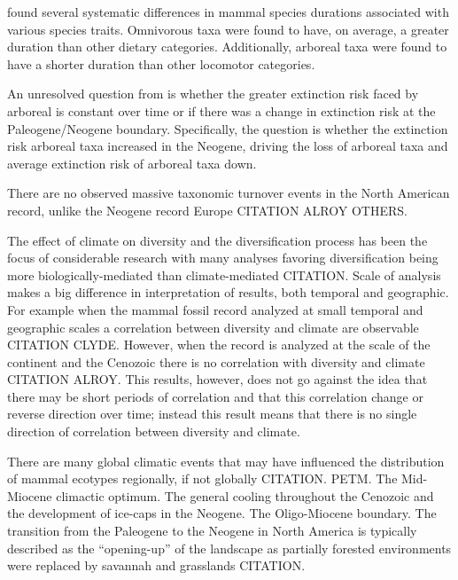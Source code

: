 \documentclass[12pt,letterpaper]{article}
\begin{document}
\citet{Smits2015} found several systematic differences in mammal species durations associated with various species traits. Omnivorous taxa were found to have, on average, a greater duration than other dietary categories. Additionally, arboreal taxa were found to have a shorter duration than other locomotor categories. 

An unresolved question from \citet{Smits2015} is whether the greater extinction risk faced by arboreal is constant over time or if there was a change in extinction risk at the Paleogene/Neogene boundary. Specifically, the question is whether the extinction risk arboreal taxa increased in the Neogene, driving the loss of arboreal taxa and average extinction risk of arboreal taxa down. 

There are no observed massive taxonomic turnover events in the North American record, unlike the Neogene record Europe CITATION ALROY OTHERS.

The effect of climate on diversity and the diversification process has been the focus of considerable research with many analyses favoring diversification being more biologically-mediated than climate-mediated CITATION. Scale of analysis makes a big difference in interpretation of results, both temporal and geographic. For example when the mammal fossil record analyzed at small temporal and geographic scales a correlation between diversity and climate are observable CITATION CLYDE. However, when the record is analyzed at the scale of the continent and the Cenozoic there is no correlation with diversity and climate CITATION ALROY. This results, however, does not go against the idea that there may be short periods of correlation and that this correlation change or reverse direction over time; instead this result means that there is no single direction of correlation between diversity and climate.

There are many global climatic events that may have influenced the distribution of mammal ecotypes regionally, if not globally CITATION. PETM. The Mid-Miocene climactic optimum. The general cooling throughout the Cenozoic and the development of ice-caps in the Neogene. The Oligo-Miocene boundary. The transition from the Paleogene to the Neogene in North America is typically described as the ``opening-up'' of the landscape as partially forested environments were replaced by savannah and grasslands CITATION.


\end{document}

